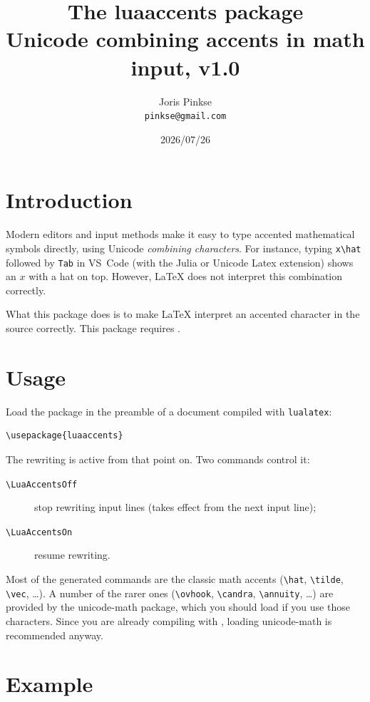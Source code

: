 \documentclass{article}
\title{The \textsf{luaaccents} package\\[1ex]
  \large Unicode combining accents in math input, v1.0}
\author{Joris Pinkse\\\texttt{pinkse@gmail.com}}
\date{2026/07/26}
\begin{document}
\maketitle

\section{Introduction}

Modern editors and input methods make it easy to type accented
mathematical symbols directly, using Unicode \emph{combining
characters}.  For instance, typing \texttt{x\textbackslash hat}
followed by \texttt{Tab} in VS~Code (with the Julia or Unicode Latex
extension) shows an $x$ with a hat on top.  However, \LaTeX{} does not
interpret this combination correctly.

What this package does is to make \LaTeX{} interpret an accented
character in the source correctly.  This package requires \LuaLaTeX{}.

\section{Usage}

Load the package in the preamble of a document compiled with
\texttt{lualatex}:

\begin{verbatim}
\usepackage{luaaccents}
\end{verbatim}

The rewriting is active from that point on.  Two commands control it:

\begin{description}
  \item[\texttt{\textbackslash LuaAccentsOff}] stop rewriting input
    lines (takes effect from the next input line);
  \item[\texttt{\textbackslash LuaAccentsOn}] resume rewriting.
\end{description}

Most of the generated commands are the classic math accents
(\verb|\hat|, \verb|\tilde|, \verb|\vec|, \ldots).  A number of the
rarer ones (\verb|\ovhook|, \verb|\candra|, \verb|\annuity|, \ldots)
are provided by the \textsf{unicode-math} package, which you should
load if you use those characters.  Since you are already compiling
with \LuaTeX{}, loading \textsf{unicode-math} is recommended anyway.

\section{Example}
\end{document}
